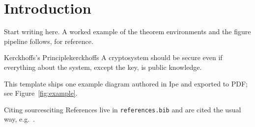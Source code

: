 \section{Introduction}
\label{sec:introduction}

Start writing here. A worked example of the theorem environments and the
figure pipeline follows, for reference.

\begin{definition}{Kerckhoffs's Principle}{kerckhoffs}
    A cryptosystem should be secure even if everything about the system,
    except the key, is public knowledge.
\end{definition}

This template ships one example diagram authored in Ipe and exported to PDF;
see Figure~\ref{fig:example}.


\begin{remark}{Citing sources}{citing}
    References live in \texttt{references.bib} and are cited the usual way,
    e.g.\ \cite{example2024}.
\end{remark}
